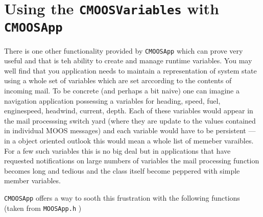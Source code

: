 \documentclass[a4paper,10pt]{article}
\newcommand{\Code}[1]{\texttt{#1} }
\newcommand{\code}[1]{\Code{#1} }
\begin{document}
\section{Using the \code{CMOOSVariables} with \code{CMOOSApp}} \label{Sec:CMOOSVariable}

There is one other functionality provided by \code{CMOOSApp} which can prove very useful and that is teh ability to create and manage runtime variables. You may well find that you application needs to maintain a representation of system state using a whole set of variables which are set arccording to the contents of incoming mail. To be concrete (and perhaps a bit naive) one can imagine a navigation application possessing a variables for heading, speed, fuel, enginespeed, headwind, current, depth. Each of these variables would appear in the mail processsing switch yard (where they are update to the values contained in individual MOOS messages) and each variable would have to be persistent --- in a object oriented outlook this would mean a whole list of memeber varaibles. For a few such variables this is no big deal but in applications that have requested notifications on large numbers of variables the mail processing function becomes long and tedious and the class itself become peppered with simple member variables.

\code{CMOOSApp} offers a way to sooth this frustration with the following functions (taken from \code{MOOSApp.h})
\end{document}
